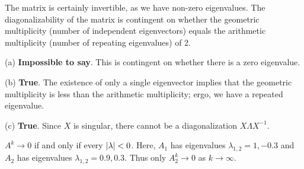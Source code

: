 \documentclass[a4paper]{article}
\begin{document}
The matrix is certainly invertible, as we have non-zero eigenvalues. The diagonalizability of the matrix is contingent on whether the geometric multiplicity (number of independent eigenvectors) equals the arithmetic multiplicity (number of repeating eigenvalues) of 2.

\vspace{12pt}


(a) \textbf{Impossible to say}. This is contingent on whether there is a zero eigenvalue.

(b) \textbf{True}. The existence of only a single eigenvector implies that the geometric multiplicity is less than the arithmetic multiplicity; ergo, we have a repeated eigenvalue.

(c) \textbf{True}. Since \(X\) is singular, there cannot be a diagonalization \(X \Lambda X^{-1}\).

\vspace{12pt}


\(A^{k} \rightarrow 0\) if and only if every \(\abs{\lambda } < 0\). Here, \(A_{1}\) has eigenvalues \(\lambda_{1,2} = 1, -0.3\) and \(A_{2}\) has eigenvalues \(\lambda_{1,2} = 0.9, 0.3\). Thus only \(A_{2}^{k} \rightarrow 0\) as \(k \rightarrow \infty\).

\vspace{12pt}
\end{document}
